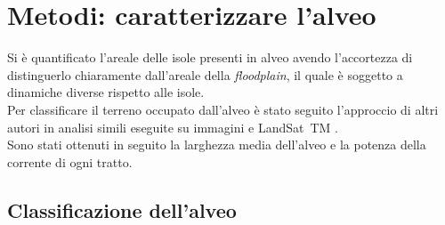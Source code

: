 \section{Metodi: caratterizzare l'alveo}
Si è quantificato l'areale delle isole presenti in alveo avendo l'accortezza di distinguerlo chiaramente dall'areale della \emph{floodplain}, il quale è soggetto a dinamiche diverse rispetto alle isole.
\\
Per classificare il terreno occupato dall'alveo è stato seguito l'approccio di altri autori in analisi simili eseguite su immagini \AST{} e LandSat~TM .
\\
Sono stati ottenuti in seguito la larghezza media dell'alveo e la potenza della corrente di ogni tratto.

\subsection{Classificazione dell'alveo}
